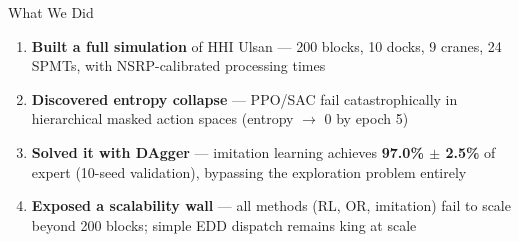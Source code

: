 \documentclass[aspectratio=169,12pt]{beamer}
\begin{document}
\begin{frame}{What We Did}

\begin{enumerate}
    \setlength\itemsep{1em}
    \item \textbf{Built a full simulation} of HHI Ulsan --- 200 blocks, 10 docks, 9 cranes, 24 SPMTs, with NSRP-calibrated processing times
    \item \textbf{Discovered entropy collapse} --- PPO/SAC fail catastrophically in hierarchical masked action spaces (entropy $\to$ 0 by epoch 5)
    \item \textbf{Solved it with DAgger} --- imitation learning achieves \textbf{97.0\% $\pm$ 2.5\%} of expert (10-seed validation), bypassing the exploration problem entirely
    \item \textbf{Exposed a scalability wall} --- all methods (RL, OR, imitation) fail to scale beyond 200 blocks; simple EDD dispatch remains king at scale
\end{enumerate}
\end{frame}
\end{document}
